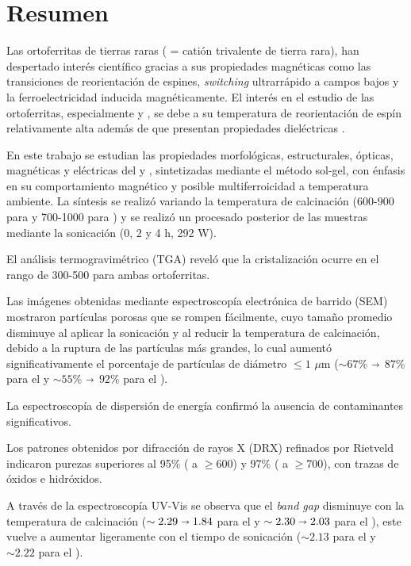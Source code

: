 \documentclass[../main.tex]{subfiles}
\begin{document}
\chapter{Resumen}
Las ortoferritas de tierras raras  ( = catión trivalente de tierra rara), han despertado interés científico gracias a sus propiedades magnéticas como las transiciones de reorientación de espines, \textit{switching} ultrarrápido a campos bajos y la ferroelectricidad inducida magnéticamente. El interés en el estudio de las ortoferritas, especialmente \neod{} y \sama{}, se debe a su temperatura de reorientación de espín relativamente alta además de que presentan propiedades dieléctricas \cite{Nakhaei2019} \cite{Sasmal2020}.

En este trabajo se estudian las propiedades morfológicas, estructurales, ópticas, magnéticas y eléctricas del \neod{} y \sama{}, sintetizadas mediante el método sol-gel, con énfasis en su comportamiento magnético y posible multiferroicidad a temperatura ambiente. La síntesis se realizó variando la temperatura de calcinación (600-900\gradoC{} para \neod{} y 700-1000\gradoC{} para \sama) y se realizó un procesado posterior de las muestras mediante la sonicación (0, 2 y 4 h, 292 W).

El análisis termogravimétrico (TGA) reveló que la cristalización ocurre en el rango de 300-500\gradoC{} para ambas ortoferritas.

Las imágenes obtenidas mediante espectroscopía electrónica de barrido (SEM) mostraron partículas porosas que se rompen fácilmente, cuyo tamaño promedio disminuye al aplicar la sonicación y al reducir la temperatura de calcinación, debido a la ruptura de las partículas más grandes, lo cual aumentó significativamente el porcentaje de partículas de diámetro $\leq1$ $\mu$m ($\sim67$\% $\shortrightarrow$ $87$\% para el \neod{} y $\sim55$\% $\shortrightarrow$ $92$\% para el \sama{}).

La espectroscopía de dispersión de energía confirmó la ausencia de contaminantes significativos.

Los patrones obtenidos por difracción de rayos X (DRX) refinados por Rietveld indicaron purezas superiores al 95\% (\neod{} a $\geq$600\gradoC) y 97\% (\sama{} a $\geq$700\gradoC), con trazas de óxidos e hidróxidos.

A través de la espectroscopía UV-Vis se observa que el \textit{band gap} disminuye con la temperatura de calcinación ($\sim2.29 \shortrightarrow 1.84$ para el \neod{} y $\sim2.30\shortrightarrow2.03$ para el \sama{}), este vuelve a aumentar ligeramente con el tiempo de sonicación ($\sim2.13$ para el \neod{} y $\sim2.22$ para el \sama{}).
\end{document}
